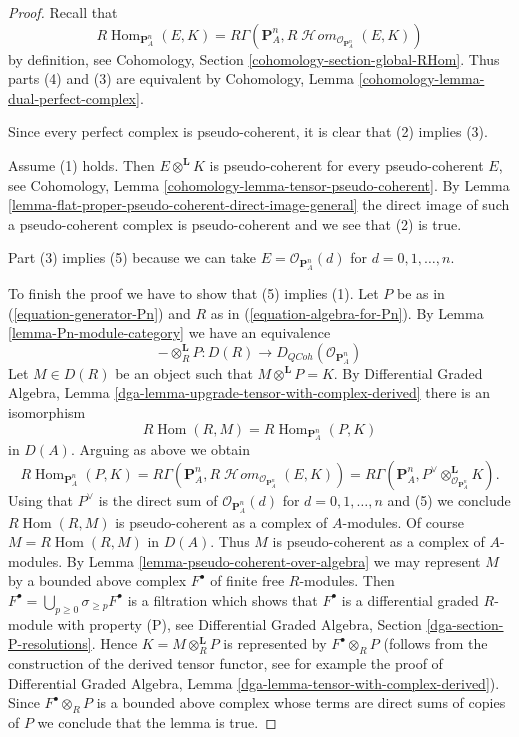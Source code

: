 \documentclass{stacks-project}
\theoremstyle{plain}
\theoremstyle{definition}
\theoremstyle{remark}
\numberwithin{equation}{subsection}
\def\Hom{\mathop{\mathrm{Hom}}\nolimits}
\def\SheafHom{\mathop{\mathcal{H}\!\mathit{om}}\nolimits}
\def\QCoh{\mathit{QCoh}}
\begin{document}
\begin{proof}
Recall that
$$
R\Hom_{\mathbf{P}^n_A}(E, K) =
R\Gamma(\mathbf{P}^n_A, R\SheafHom_{\mathcal{O}_{\mathbf{P}^n_A}}(E, K))
$$
by definition, see Cohomology, Section \ref{cohomology-section-global-RHom}.
Thus parts (4) and (3) are equivalent by
Cohomology, Lemma \ref{cohomology-lemma-dual-perfect-complex}.

\medskip\noindent
Since every perfect complex is pseudo-coherent, it is clear that
(2) implies (3).

\medskip\noindent
Assume (1) holds. Then $E \otimes^\mathbf{L} K$ is pseudo-coherent
for every pseudo-coherent $E$, see
Cohomology, Lemma \ref{cohomology-lemma-tensor-pseudo-coherent}.
By Lemma \ref{lemma-flat-proper-pseudo-coherent-direct-image-general}
the direct image of such a pseudo-coherent complex is pseudo-coherent
and we see that (2) is true.

\medskip\noindent
Part (3) implies (5) because we can take $E = \mathcal{O}_{\mathbf{P}^n_A}(d)$
for $d = 0, 1, \ldots, n$.

\medskip\noindent
To finish the proof we have to show that (5) implies (1).
Let $P$ be as in (\ref{equation-generator-Pn}) and
$R$ as in (\ref{equation-algebra-for-Pn}).
By Lemma \ref{lemma-Pn-module-category} we have an equivalence
$$
- \otimes^\mathbf{L}_R P :
D(R) \longrightarrow D_\QCoh(\mathcal{O}_{\mathbf{P}^n_A})
$$
Let $M \in D(R)$ be an object such that $M \otimes^\mathbf{L} P = K$.
By Differential Graded Algebra, Lemma
\ref{dga-lemma-upgrade-tensor-with-complex-derived}
there is an isomorphism
$$
R\Hom(R, M) = R\Hom_{\mathbf{P}^n_A}(P, K)
$$
in $D(A)$. Arguing as above we obtain
$$
R\Hom_{\mathbf{P}^n_A}(P, K) = R\Gamma(\mathbf{P}^n_A,
R\SheafHom_{\mathcal{O}_{\mathbf{P}^n_A}}(E, K)) =
R\Gamma(\mathbf{P}^n_A,
P^\vee \otimes^\mathbf{L}_{\mathcal{O}_{\mathbf{P}^n_A}} K).
$$
Using that $P^\vee$ is the direct sum of
$\mathcal{O}_{\mathbf{P}^n_A}(d)$ for $d = 0, 1, \ldots, n$
and (5) we conclude $R\Hom(R, M)$ is pseudo-coherent as a complex
of $A$-modules. Of course $M = R\Hom(R, M)$ in $D(A)$.
Thus $M$ is pseudo-coherent as a complex of $A$-modules.
By Lemma \ref{lemma-pseudo-coherent-over-algebra}
we may represent $M$ by a bounded above complex $F^\bullet$
of finite free $R$-modules. Then
$F^\bullet = \bigcup_{p \geq 0} \sigma_{\geq p}F^\bullet$
is a filtration which shows that $F^\bullet$ is a differential
graded $R$-module with property (P), see
Differential Graded Algebra, Section \ref{dga-section-P-resolutions}.
Hence $K = M \otimes^\mathbf{L}_R P$ is represented
by $F^\bullet \otimes_R P$ (follows from the construction of the
derived tensor functor, see for example the proof of
Differential Graded Algebra, Lemma \ref{dga-lemma-tensor-with-complex-derived}).
Since $F^\bullet \otimes_R P$
is a bounded above complex whose terms are direct sums of
copies of $P$ we conclude that the lemma is true.
\end{proof}
\end{document}
